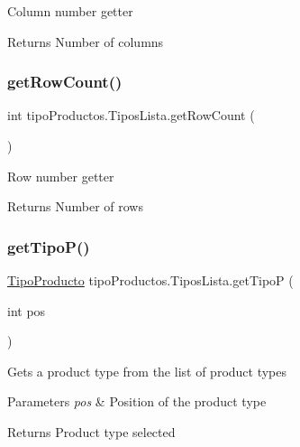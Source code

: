 Column number getter \begin{DoxyReturn}{Returns}
Number of columns 
\end{DoxyReturn}
\mbox{\label{classtipo_productos_1_1_tipos_lista_a619180cf0e73dd687d83511c805b0a7d}} 
\subsubsection{\texorpdfstring{get\+Row\+Count()}{getRowCount()}}
{\footnotesize\ttfamily int tipo\+Productos.\+Tipos\+Lista.\+get\+Row\+Count (\begin{DoxyParamCaption}{ }\end{DoxyParamCaption})\hspace{0.3cm}{\ttfamily [inline]}}

Row number getter \begin{DoxyReturn}{Returns}
Number of rows 
\end{DoxyReturn}
\mbox{\label{classtipo_productos_1_1_tipos_lista_a825bd94b7e40672ab7d3a84083c21245}} 
\subsubsection{\texorpdfstring{get\+Tipo\+P()}{getTipoP()}}
{\footnotesize\ttfamily \mbox{\hyperlink{classtipo_productos_1_1_tipo_producto}{Tipo\+Producto}} tipo\+Productos.\+Tipos\+Lista.\+get\+TipoP (\begin{DoxyParamCaption}\item[{int}]{pos }\end{DoxyParamCaption})\hspace{0.3cm}{\ttfamily [inline]}}

Gets a product type from the list of product types 
\begin{DoxyParams}{Parameters}
{\em pos} & Position of the product type \\
\hline
\end{DoxyParams}
\begin{DoxyReturn}{Returns}
Product type selected 
\end{DoxyReturn}
\mbox{\label{classtipo_productos_1_1_tipos_lista_a78deb10c0cd2fbc2dfa0de19054e033e}} 

